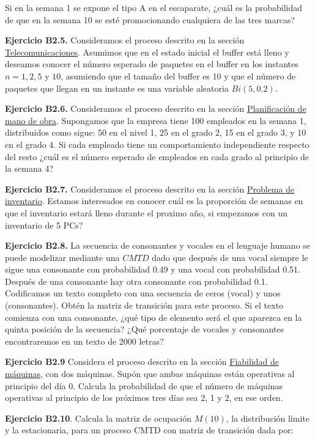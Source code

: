 \documentclass[
]{book}
\theoremstyle{definition}
\theoremstyle{definition}
\theoremstyle{definition}
\theoremstyle{definition}
\theoremstyle{remark}
\begin{document}
Si en la semana 1 se expone el tipo A en el escaparate, ¿cuál es la probabilidad de que en la semana 10 se esté promocionando cualquiera de las tres marcas?

\textbf{Ejercicio B2.5.} Consideramos el proceso descrito en la sección \protect\hyperlink{telecomunicaciones}{Telecomunicaciones}. Asumimos que en el estado inicial el buffer está lleno y deseamos conocer el número esperado de paquetes en el buffer en los instantes \(n =1, 2, 5\) y \(10\), asumiendo que el tamaño del buffer es 10 y que el número de paquetes que llegan en un instante es una variable aleatoria \(Bi(5, 0.2).\)

\textbf{Ejercicio B2.6.} Consideramos el proceso descrito en la sección \protect\hyperlink{planificacion}{Planificación de mano de obra}. Supongamos que la empresa tiene 100 empleados en la semana 1, distribuidos como sigue: 50 en el nivel 1, 25 en el grado 2, 15 en el grado 3, y 10 en el grado 4. Si cada empleado tiene un comportamiento independiente respecto del resto ¿cuál es el número esperado de empleados en cada grado al principio de la semana 4?

\textbf{Ejercicio B2.7.} Consideramos el proceso descrito en la sección \protect\hyperlink{inventario}{Problema de inventario}. Estamos interesados en conocer cuál es la proporción de semanas en que el inventario estará lleno durante el proximo año, si empezamos con un inventario de 5 PCs?

\textbf{Ejercicio B2.8.} La secuencia de consonantes y vocales en el lenguaje humano se puede modelizar mediante una \(CMTD\) dado que después de una vocal siempre le sigue una consonante con probabilidad 0.49 y una vocal con probabilidad 0.51. Después de una consonante hay otra consonante con probabilidad 0.1. Codificamos un texto completo con una secuencia de ceros (vocal) y unos (consonantes). Obtén la matriz de transición para este proceso. Si el texto comienza con una consonante, ¿qué tipo de elemento será el que aparezca en la quinta posición de la secuencia? ¿Qué porcentaje de vocales y consonantes encontraremos en un texto de 2000 letras?

\textbf{Ejercicio B2.9} Considera el proceso descrito en la sección \protect\hyperlink{fiabilidad}{Fiabilidad de máquinas}, con dos máquinas. Supón que ambas máquinas están operativas al principio del día 0. Calcula la probabilidad de que el número de máquinas operativas al principio de los próximos tres días sea 2, 1 y 2, en ese orden.

\textbf{Ejercicio B2.10}. Calcula la matriz de ocupación \(M(10)\), la distribución límite y la estacionaria, para un proceso CMTD con matriz de transición dada por:
\end{document}
